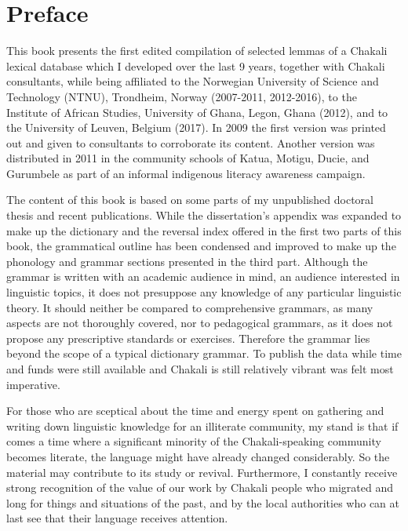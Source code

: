 \chapter*{Preface} 


This book presents the first edited compilation of selected lemmas of a Chakali lexical database which  I developed over the last 9 years, together with Chakali consultants, while being affiliated to the 
Norwegian University of Science and Technology (NTNU), 
Trondheim, Norway (2007-2011, 2012-2016),  to the 
Institute of African Studies, University of Ghana, Legon, Ghana (2012), and to the 
University of Leuven, Belgium  (2017).   
In 2009 the first version  was printed out  and given to consultants to corroborate its content. Another version was distributed in 2011 in the community schools of Katua, Motigu, Ducie,  and Gurumbele  as part of  an informal indigenous literacy awareness campaign. 

The content of this book is based on some parts of my unpublished doctoral  thesis  \citep{brin11} and recent publications. While the dissertation's  appendix was expanded to make up the dictionary and the  reversal index offered in the first two parts of this book, the grammatical outline has been condensed and improved to make up the phonology and grammar sections presented in the third part.  Although the grammar is written with an academic audience in mind, an audience interested in   linguistic topics, it does not presuppose any knowledge of any particular linguistic theory.  It should neither be compared to comprehensive grammars,  as many aspects are not thoroughly covered,  nor to  pedagogical grammars, as it does not propose any prescriptive standards or exercises. Therefore the grammar lies beyond the scope of a typical dictionary grammar. To  publish the data  while time and funds were still available and Chakali is still relatively vibrant was felt most  imperative.

For those who are sceptical about the time and energy spent on gathering and writing down linguistic  knowledge for an illiterate community, my stand is that if comes a  time where a significant minority of the Chakali-speaking community becomes literate, the language might have already changed considerably.  So the material may contribute to its study or revival.  Furthermore,   I constantly receive strong recognition of the value of our work by Chakali people who migrated and long for things and situations of the past, and by the local authorities who can at last see that their language  receives attention.

